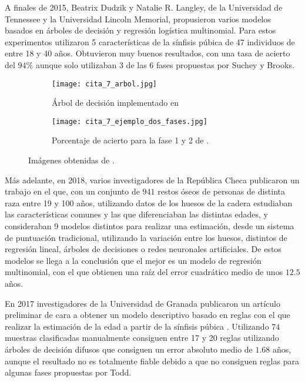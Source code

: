 A finales de 2015, Beatrix Dudzik y Natalie R. Langley, de la Universidad de Tennessee y la Universidad Lincoln Memorial, propusieron \cite{componentBased} varios modelos basados en árboles de decisión y regresión logística multinomial. Para estos experimentos utilizaron 5 características de la sínfisis púbica de 47 individuos de entre 18 y 40 años. Obtuvieron muy buenos resultados, con una tasa de acierto del $94\%$ aunque solo utilizaban 3 de las 6 fases propuestas por Suchey y Brooks.

\begin{figure}[H]
	\centering
	\begin{subfigure}{.5\textwidth}
	  \centering
	  \texttt{[image: cita\_7\_arbol.jpg]}
	  \caption{Árbol de decisión implementado en \cite{componentBased}}
	  \label{fig:arbol_c7}
	\end{subfigure}%
	\begin{subfigure}{.5\textwidth}
	  \centering
	  \texttt{[image: cita\_7\_ejemplo\_dos\_fases.jpg]}
	  \caption{Porcentaje de acierto para la fase 1 y 2 de \cite{componentBased}.}
	  \label{fig:acierto_cita7}
	\end{subfigure}
	\caption{Imágenes obtenidas de \cite{componentBased}.}
	\label{fig:arboles_cita7}
\end{figure}



Más adelante, en 2018, varios investigadores de la República Checa publicaron un trabajo \cite{estimacionHuesosCadera} en el que, con un conjunto de $941$ restos óseos de personas de distinta raza entre 19 y 100 años, utilizando datos de los huesos de la cadera estudiaban las características comunes y las que diferenciaban las distintas edades, y consideraban 9 modelos distintos para realizar una estimación, desde un sistema de puntuación tradicional, utilizando la variación entre los huesos, distintos de regresión lineal, árboles de decisiones o redes neuronales artificiales. De estos modelos se llega a la conclusión que el mejor es un modelo de regresión multinomial, con el que obtienen una raíz del error cuadrático medio de unos $12.5$ años.

En 2017 investigadores de la Universidad de Granada publicaron un artículo preliminar de cara a obtener un modelo descriptivo basado en reglas con el que realizar la estimación de la edad a partir de la sínfisis púbica \cite{fuzzyAgeEstimation}. Utilizando $74$ muestras clasificadas manualmente consiguen entre 17 y 20 reglas utilizando árboles de decisión difusos que consiguen un error absoluto medio de $1.68$ años, aunque el resultado no es totalmente fiable debido a que no consiguen reglas para algunas fases propuestas por Todd.

